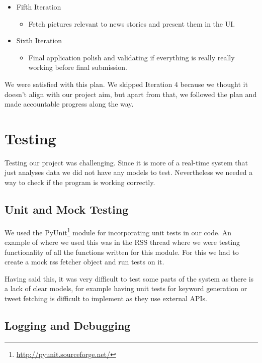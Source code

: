 \documentclass{report}
\begin{document}
\begin{itemize}
			\item Fifth Iteration
			\begin{itemize}
				\item Fetch pictures relevant to news stories and present them in the UI.
			\end{itemize}
			
			\item Sixth Iteration
			\begin{itemize}
				\item Final application polish and validating if everything is really really working before final submission.
			\end{itemize}
			
		\end{itemize}
		
		We were satisfied with this plan. We skipped Iteration 4 because we thought it doesn’t align with our project aim, but apart from that, we followed the plan and made accountable progress along the way.
	
			\section{Testing}
			  Testing our project was challenging. Since it is more of a real-time system that just analyses data we did not have any models to test. Nevertheless we needed a way to check if the program is working correctly.

			  \subsection{Unit and Mock Testing}

			  We used the PyUnit\footnote{\url{http://pyunit.sourceforge.net/}} module for incorporating unit tests in our code. An example of where we used this was in the RSS thread where we were testing functionality of all the functions written for this module. For this we had to create a mock rss fetcher object and run tests on it.

			  Having said this, it was very difficult to test some parts of the system as there is a lack of clear models, for example having unit tests for keyword generation or tweet fetching is difficult to implement as they use external APIs.

			  \subsection{Logging and Debugging}
\end{document}
